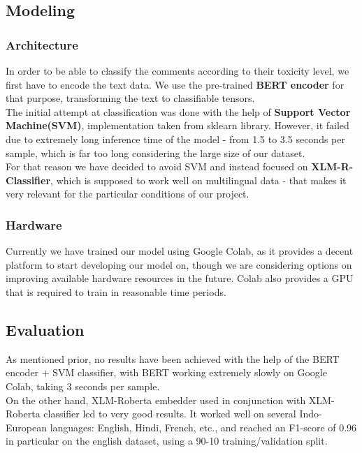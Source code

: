 \documentclass[]{article}
\begin{document}
	\subsection{Modeling}
	
	\subsubsection{Architecture}
	
	In order to be able to classify the comments according to their toxicity level, we first have to encode the text data. We use the pre-trained \textbf{BERT encoder} for that purpose, transforming the text to classifiable tensors. \\
	
	The initial attempt at classification was done with the help of \textbf{Support Vector Machine(SVM)}, implementation taken from sklearn library. However, it failed due to extremely long inference time of the model - from 1.5 to 3.5 seconds per sample, which is far too long considering the large size of our dataset.\\
	
	For that reason we have decided to avoid SVM and instead focused on \textbf{XLM-R-Classifier}, which is supposed to work well on multilingual data - that makes it very relevant for the particular conditions of our project.
	
	\subsubsection{Hardware}
	
	Currently we have trained our model using Google Colab, as it provides a decent platform to start developing our model on, though we are considering options on improving available hardware resources in the future. Colab also provides a GPU that is required to train in reasonable time periods.
	
	\subsection{Evaluation}
	
	As mentioned prior, no results have been achieved with the help of the BERT encoder + SVM classifier, with BERT working extremely slowly on Google Colab, taking 3 seconds per sample. \\
	On the other hand, XLM-Roberta embedder used in conjunction with XLM-Roberta classifier led to very good results. It worked well on several Indo-European languages: English, Hindi, French, etc., and reached an F1-score of 0.96 in particular on the english dataset, using a 90-10 training/validation split.
	
\end{document}
